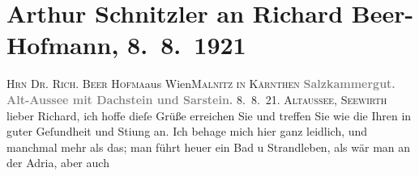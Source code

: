 

         
         \renewcommand{\erwaehntePersonen}{Personen: Richard Beer-Hofmann, Heinrich Schnitzler, Lili Schnitzler, Olga Schnitzler}
         \renewcommand{\erwaehnteOrte}{Orte: Adriatisches Meer, Altaussee, Dachstein, Kärnten, Mallnitz, Possenhofen, Salzburg, Salzkammergut, Sarstein, Seewirt, Wien}
         \renewcommand{\erwaehnteWerke}{}
               \section[Arthur Schnitzler an Richard Beer-Hofmann, 8. 8. 1921]{ Arthur Schnitzler an Richard Beer-Hofmann, 8. 8. 1921}\nopagebreak{}\rehead{ }\begin{ledgroupsized}[t]{13cm}\normalsize\beginnumbering{} \toendnotes[C]{\smallbreak\pagebreak[2]} 
\toendnotes[C]{\smallbreak}\pstart{}{\pb}\textsc{Hrn Dr. Rich. Beer Hofma{\geminationn}}\pend{}\pstart{}aus Wien\pend{}\pstart{}\textsc{Malnitz in Kärnthen}\pend{}{\bigskip}\pstart
           \noindent{}\centering{}{\pb}\textcolor{gray}{\textbf{Salzkammergut. Alt-Aussee mit Dachstein und Sarstein.}}\pend
           \pstart
           \raggedleft{}8. 8. 21. \textsc{Altaussee, Seewirth}\pend
           \pstart
           lieber Richard, ich hoffe dieſe Grüße erreichen Sie und treffen Sie
               wie die Ihren in guter Geſundheit und Sti{\geminationm}ung an. Ich
               behage mich hier ganz leidlich, und manchmal mehr als das; man führt heuer ein Bad u
               Strandleben, als wär man an der Adria, aber auch

\end{ledgroupsized}
